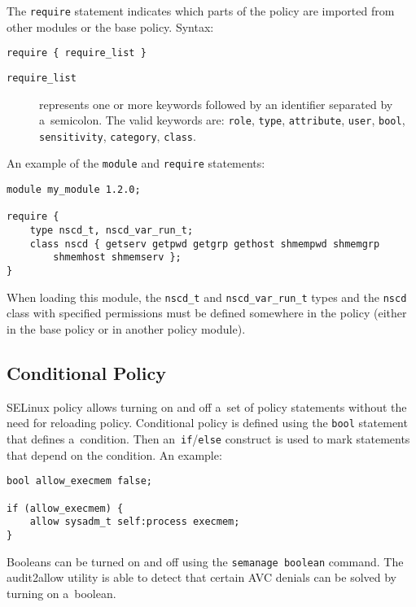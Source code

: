 The \texttt{require} statement indicates which parts of the policy are imported
from other modules or the base policy. Syntax:
\begin{lstlisting}[language=te]
require { require_list }
\end{lstlisting}
\begin{description}
    \item [\texttt{require\_list}] represents one or more keywords followed by
        an identifier separated by a~semicolon. The valid keywords are:
        \texttt{role}, \texttt{type}, \texttt{attribute}, \texttt{user},
        \texttt{bool}, \texttt{sensitivity}, \texttt{category}, \texttt{class}.
\end{description}

An example of the \texttt{module} and \texttt{require} statements:
\begin{lstlisting}[language=te]
module my_module 1.2.0;

require {
    type nscd_t, nscd_var_run_t;
    class nscd { getserv getpwd getgrp gethost shmempwd shmemgrp
        shmemhost shmemserv };
}
\end{lstlisting}
When loading this module, the \texttt{nscd\_t} and \texttt{nscd\_var\_run\_t}
types and the \texttt{nscd} class with specified permissions must be defined
somewhere in the policy (either in the base policy or in another policy module).

\subsection{Conditional Policy}
\label{booleans}
SELinux policy allows turning on and off a~set of policy statements without the
need for reloading policy. Conditional policy is defined using the \texttt{bool}
statement that defines a~condition. Then an~\texttt{if}/\texttt{else} construct
is used to mark statements that depend on the condition. An example:
\begin{lstlisting}[language=te]
bool allow_execmem false;

if (allow_execmem) {
    allow sysadm_t self:process execmem;
}
\end{lstlisting}
Booleans can be turned on and off using the \texttt{semanage boolean} command.
The audit2allow utility is able to detect that certain AVC denials can be solved
by turning on a~boolean.

